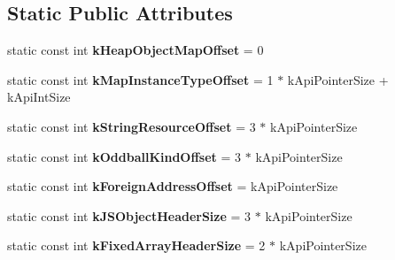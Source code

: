 \subsection*{Static Public Attributes}
\begin{DoxyCompactItemize}
\item 
\hypertarget{classv8_1_1internal_1_1_internals_a0902a596b5656b4592157eaacc020512}{}static const int {\bfseries k\+Heap\+Object\+Map\+Offset} = 0\label{classv8_1_1internal_1_1_internals_a0902a596b5656b4592157eaacc020512}

\item 
\hypertarget{classv8_1_1internal_1_1_internals_a39ea290dfaa9de300bd79aa73a874a88}{}static const int {\bfseries k\+Map\+Instance\+Type\+Offset} = 1 $\ast$ k\+Api\+Pointer\+Size + k\+Api\+Int\+Size\label{classv8_1_1internal_1_1_internals_a39ea290dfaa9de300bd79aa73a874a88}

\item 
\hypertarget{classv8_1_1internal_1_1_internals_a8c2b35069864f567ca0c571310dd90a1}{}static const int {\bfseries k\+String\+Resource\+Offset} = 3 $\ast$ k\+Api\+Pointer\+Size\label{classv8_1_1internal_1_1_internals_a8c2b35069864f567ca0c571310dd90a1}

\item 
\hypertarget{classv8_1_1internal_1_1_internals_a98685d6861a07139720cd296f94f2b73}{}static const int {\bfseries k\+Oddball\+Kind\+Offset} = 3 $\ast$ k\+Api\+Pointer\+Size\label{classv8_1_1internal_1_1_internals_a98685d6861a07139720cd296f94f2b73}

\item 
\hypertarget{classv8_1_1internal_1_1_internals_ad4134449ee39b95e5ac035996aa7d66b}{}static const int {\bfseries k\+Foreign\+Address\+Offset} = k\+Api\+Pointer\+Size\label{classv8_1_1internal_1_1_internals_ad4134449ee39b95e5ac035996aa7d66b}

\item 
\hypertarget{classv8_1_1internal_1_1_internals_af8faf3ff3271d26bafa6ca0ea87e2a57}{}static const int {\bfseries k\+J\+S\+Object\+Header\+Size} = 3 $\ast$ k\+Api\+Pointer\+Size\label{classv8_1_1internal_1_1_internals_af8faf3ff3271d26bafa6ca0ea87e2a57}

\item 
\hypertarget{classv8_1_1internal_1_1_internals_a715ca62a5ddceac28d43c470db067675}{}static const int {\bfseries k\+Fixed\+Array\+Header\+Size} = 2 $\ast$ k\+Api\+Pointer\+Size\label{classv8_1_1internal_1_1_internals_a715ca62a5ddceac28d43c470db067675}


\end{DoxyCompactItemize}
